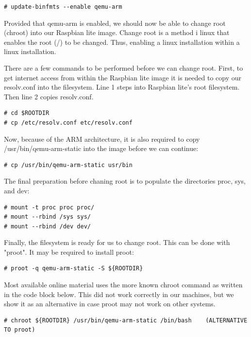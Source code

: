 \begin{lstlisting}[]
# update-binfmts --enable qemu-arm
\end{lstlisting}
\FloatBarrier

Provided that qemu-arm is enabled, we should now be able to change root (chroot)
into our Raspbian lite image. Change root is a method i linux that enables
the root (/) to be changed. Thus, enabling a linux installation within a
linux installation.

There are a few commands to be performed before we can change root.
First, to get internet access from within the Raspbian lite image it is needed
to copy our resolv.conf into the filesystem. Line 1 steps into Raspbian lite's
root filesystem. Then line 2 copies resolv.conf.

\begin{lstlisting}[]
# cd $ROOTDIR
# cp /etc/resolv.conf etc/resolv.conf
\end{lstlisting}
\FloatBarrier

Now, because of the ARM architecture, it is also required to copy
/usr/bin/qemu-arm-static into the image before we can continue:

\begin{lstlisting}[]
# cp /usr/bin/qemu-arm-static usr/bin
\end{lstlisting}
\FloatBarrier

The final preparation before chaning root is to populate the directories proc,
sys, and dev:

\begin{lstlisting}[]
# mount -t proc proc proc/
# mount --rbind /sys sys/
# mount --rbind /dev dev/
\end{lstlisting}
\FloatBarrier

Finally, the filesystem is ready for us to change root. This can be done with
"proot". It may be required to install proot:

\begin{lstlisting}[]
# proot -q qemu-arm-static -S ${ROOTDIR}
\end{lstlisting}
\FloatBarrier

Most available online material uses the more known chroot command as written in
the code block below. This did not work correctly in our machines, but we show
it as an alternative in case proot may not work on other systems.

\begin{lstlisting}[]
# chroot ${ROOTDIR} /usr/bin/qemu-arm-static /bin/bash    (ALTERNATIVE TO proot)
\end{lstlisting}
\FloatBarrier

